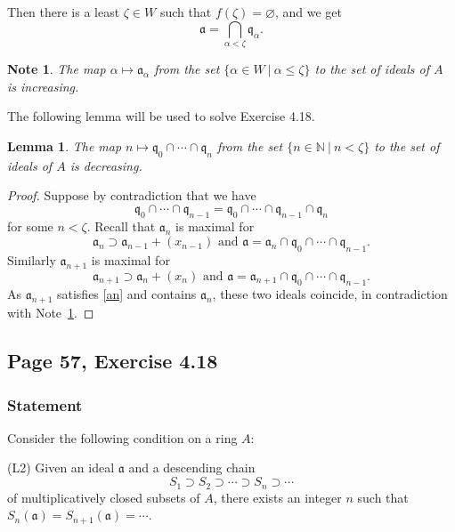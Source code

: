 \documentclass[parskip=half,fontsize=12pt]{scrartcl}%
\newcommand{\mf}{\mathfrak}
\newcommand{\aaa}{\mf a}
\newcommand{\qqq}{\mf q}
\newtheorem{lem}[thm]{Lemma}
\newtheorem{note}[thm]{Note}
\begin{document}
Then there is a least $\zeta\in W$ such that $f(\zeta)=\varnothing$, and we get 
\begin{equation}\label{abak}
\aaa=\bigcap_{\alpha<\zeta}\qqq_\alpha.
\end{equation} 
\begin{note}\label{amaa}
The map $\alpha\mapsto\aaa_\alpha$ from the set $\{\alpha\in W\ |\ \alpha\le\zeta\}$ to the set of ideals of $A$ is increasing.
\end{note} 
The following lemma will be used to solve Exercise 4.18. 
\begin{lem}\label{lasker}
The map $n\mapsto\qqq_0\cap\cdots\cap\qqq_n$ from the set $\{n\in\mathbb N\ |\ n<\zeta\}$ to the set of ideals of $A$ is decreasing.
\end{lem}
\begin{proof}
Suppose by contradiction that we have 
$$
\qqq_0\cap\cdots\cap\qqq_{n-1}=\qqq_0\cap\cdots\cap\qqq_{n-1}\cap\qqq_n
$$ 
for some $n<\zeta$. Recall that $\aaa_n$ is maximal for 
\begin{equation}\label{an}
\aaa_n\supset\aaa_{n-1}+(x_{n-1})\text{ and }\aaa=\aaa_n\cap\qqq_0\cap\cdots\cap\qqq_{n-1}.
\end{equation} 
Similarly $\aaa_{n+1}$ is maximal for 
$$%
\aaa_{n+1}\supset\aaa_n+(x_n)\text{ and }\aaa=\aaa_{n+1}\cap\qqq_0\cap\cdots\cap\qqq_{n-1}.
$$%
As $\aaa_{n+1}$ satisfies \eqref{an} and contains $\aaa_n$, these two ideals coincide, in contradiction with Note~\ref{amaa}. 
\end{proof}

\subsection{Page 57, Exercise 4.18}%

\subsubsection{Statement}%

Consider the following condition on a ring $A$:

(L2) Given an ideal $\mathfrak a$ and a descending chain 
$$
S_1\supset S_2\supset\cdots\supset S_n\supset\cdots
$$ 
of multiplicatively closed subsets of $A$, there exists an integer $n$ such that $S_n(\mathfrak a)=S_{n+1}(\mathfrak a)=\cdots$. %
\end{document}
